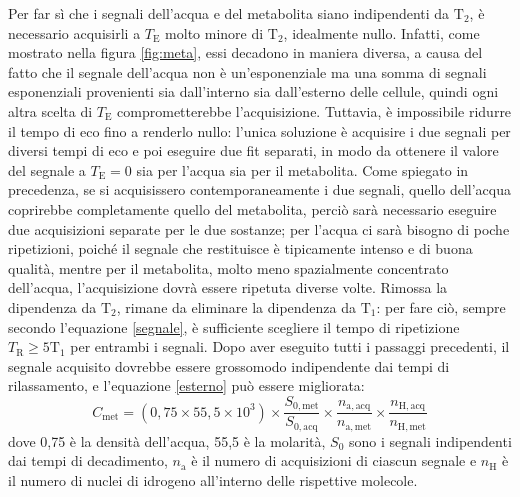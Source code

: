 \documentclass{report}
\newcommand{\figref}[1]{figura \ref{#1}}
\renewcommand{\eqref}[1]{equazione \ref{#1}}
\numberwithin{equation}{section}
\numberwithin{figure}{section}
\begin{document}
Per far sì che i segnali dell'acqua e del metabolita siano indipendenti da $\mathrm{T_2}$, è necessario acquisirli a  $T_\mathrm{E}$ molto minore di $\mathrm{T_2}$, idealmente nullo. Infatti, come mostrato nella \figref{fig:meta}, essi decadono in maniera diversa, a causa del fatto che il segnale dell'acqua non è un'esponenziale ma una somma di segnali esponenziali provenienti sia dall'interno sia dall'esterno delle cellule, quindi ogni altra scelta di $T_\mathrm{E}$ comprometterebbe l'acquisizione. Tuttavia, è impossibile ridurre il tempo di eco fino a renderlo nullo: l'unica soluzione è acquisire i due segnali per diversi tempi di eco e poi eseguire due fit separati, in modo da ottenere il valore del segnale a $T_\mathrm{E} = 0$ sia per l'acqua sia per il metabolita. Come spiegato in precedenza, se si acquisissero contemporaneamente i due segnali, quello dell'acqua coprirebbe completamente quello del metabolita, perciò sarà necessario eseguire due acquisizioni separate per le due sostanze; per l'acqua ci sarà bisogno di poche ripetizioni, poiché il segnale che restituisce è tipicamente intenso e di buona qualità, mentre per il metabolita, molto meno spazialmente concentrato dell'acqua, l'acquisizione dovrà essere ripetuta diverse volte. Rimossa la dipendenza da $\mathrm{T_2}$, rimane da eliminare la dipendenza da $\mathrm{T_1}$: per fare ciò, sempre secondo l'\eqref{segnale}, è sufficiente scegliere il tempo di ripetizione $T_\mathrm{R} \geq 5\mathrm{T_1}$ per entrambi i segnali. Dopo aver eseguito tutti i passaggi precedenti, il segnale acquisito dovrebbe essere grossomodo indipendente dai tempi di rilassamento, e l'\eqref{esterno} può essere migliorata:
\begin{equation}
    \boxed{C_\mathrm{met} = (0,75 \times 55,5 \times 10^3) \times \frac{S_{0,\mathrm{met}}}{S_{0,\mathrm{acq}}} \times \frac{n_\mathrm{a,acq}}{n_\mathrm{a,met}} \times \frac{n_\mathrm{H,acq}}{n_\mathrm{H,met}}}
\end{equation}
dove 0,75 è la densità dell'acqua, 55,5 è la molarità, $S_0$ sono i segnali indipendenti dai tempi di decadimento, $n_\mathrm{a}$ è il numero di acquisizioni di ciascun segnale e $n_\mathrm{H}$ è il numero di nuclei di idrogeno all'interno delle rispettive molecole.
\end{document}
